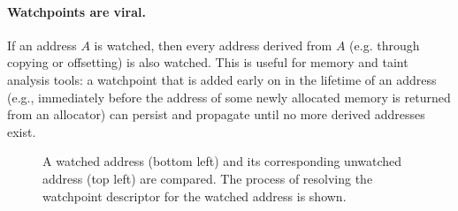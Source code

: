 \documentclass[letterpaper,twocolumn,10pt]{article}
\let\ORIGcaption\caption
\renewcommand{\caption}[2][\compressedcaption]{%
\def\compressedcaption{#2}%
    \vspace{-12pt}%
    \ORIGcaption[#1]{#2}%
    \vspace{-12pt}}
\begin{document}
	
\paragraph{Watchpoints are viral.} If an address $A$ is watched, then every address derived from $A$ (e.g. through copying or offsetting) is also watched. This is useful for memory and taint analysis tools: a watchpoint that is added early on in the lifetime of an address (e.g., immediately before the address of some newly allocated memory is returned from an allocator) can persist and propagate until no more derived addresses exist.

\begin{figure}[t]
\begin{center}
\end{center}
\caption{\label{fig:watchpoint_descriptor_table}A watched address (bottom left) and its corresponding unwatched address (top left) are compared. The process of resolving the watchpoint descriptor for the watched address is shown.}
\end{figure}








\end{document}
